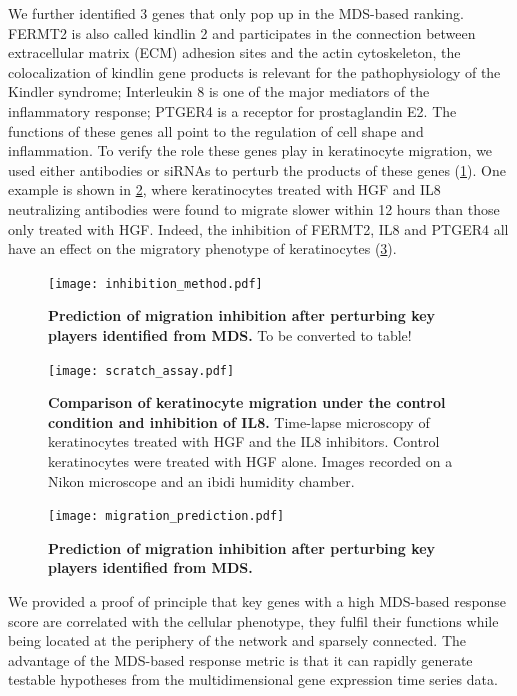 We further identified 3 genes that only pop up in the MDS-based ranking.
FERMT2 is also called kindlin 2 and participates in the connection between 
extracellular matrix (ECM) adhesion sites and the actin cytoskeleton, the
colocalization of kindlin gene products is relevant for the pathophysiology
of the Kindler syndrome; Interleukin 8 is one of the major mediators
of the inflammatory response; PTGER4 is a receptor for prostaglandin E2.
The functions of these genes all point to the regulation of cell shape and
inflammation. 
To verify the role these genes play in keratinocyte migration,
we used either antibodies or siRNAs to perturb the products of these genes
(\ref{fig:inhibition_method}). One example is shown in 
\ref{fig:scratch_assay}, where keratinocytes treated with HGF and IL8 
neutralizing antibodies were found to migrate slower within 12 hours 
than those only treated with HGF.
Indeed, the inhibition of FERMT2, IL8 and PTGER4 all have an effect on the 
migratory phenotype of keratinocytes (\ref{fig:migration_prediction}).

\begin{figure}[!ht]
\begin{center}
\texttt{[image: inhibition\_method.pdf]}
\end{center}
\caption[Prediction of migration inhibition after perturbing key players]{
{\bf Prediction of migration inhibition after perturbing key players identified
from MDS.} To be converted to table!
}
\label{fig:inhibition_method}
\end{figure}

\begin{figure}[!ht]
\begin{center}
\texttt{[image: scratch\_assay.pdf]}
\end{center}
\caption[Migration of keratinocytes]{
{\bf Comparison of keratinocyte migration under the control condition and 
inhibition of IL8.}
Time-lapse microscopy of keratinocytes treated with HGF and the IL8 inhibitors. 
Control keratinocytes were treated with HGF alone. Images recorded on a Nikon 
microscope and an ibidi humidity chamber.
}
\label{fig:scratch_assay}
\end{figure}

\begin{figure}[!ht]
\begin{center}
\texttt{[image: migration\_prediction.pdf]}
\end{center}
\caption[Prediction of migration inhibition after perturbing key players]{
{\bf Prediction of migration inhibition after perturbing key players identified
from MDS.} 
}
\label{fig:migration_prediction}
\end{figure}

We provided a proof of principle that key genes with a high MDS-based response
score are correlated with the cellular phenotype, they fulfil their functions
while being located at the periphery of the network and sparsely connected.
The advantage of the MDS-based response metric is that it can rapidly generate
testable hypotheses from the multidimensional gene expression time series data.

